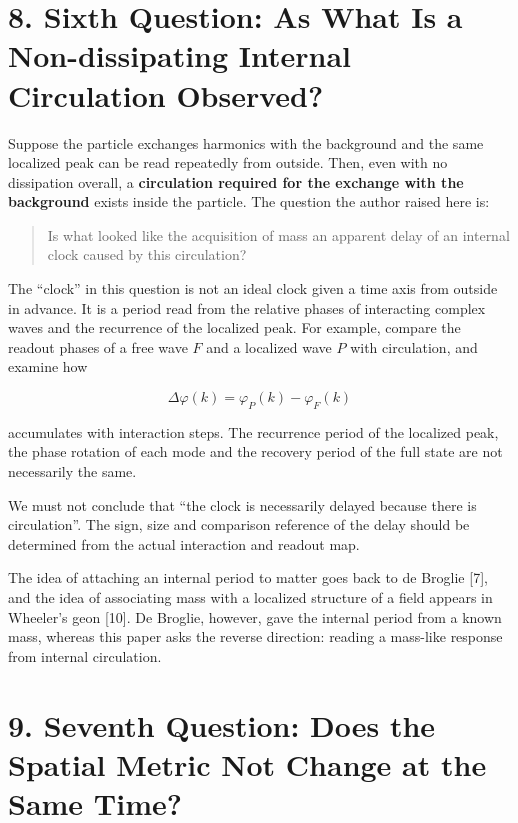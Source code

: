 \documentclass[
  a4paper,
]{article}
\begin{document}
\section{8. Sixth Question: As What Is a Non-dissipating Internal
Circulation
Observed?}\label{sixth-question-as-what-is-a-non-dissipating-internal-circulation-observed}

Suppose the particle exchanges harmonics with the background and the
same localized peak can be read repeatedly from outside. Then, even with
no dissipation overall, a \textbf{circulation required for the exchange
with the background} exists inside the particle. The question the author
raised here is:

\begin{quote}
Is what looked like the acquisition of mass an apparent delay of an
internal clock caused by this circulation?
\end{quote}

The ``clock'' in this question is not an ideal clock given a time axis
from outside in advance. It is a period read from the relative phases of
interacting complex waves and the recurrence of the localized peak. For
example, compare the readout phases of a free wave \(F\) and a localized
wave \(P\) with circulation, and examine how

\[
\Delta\varphi(k)=\varphi_P(k)-\varphi_F(k)
\]

accumulates with interaction steps. The recurrence period of the
localized peak, the phase rotation of each mode and the recovery period
of the full state are not necessarily the same.

We must not conclude that ``the clock is necessarily delayed because
there is circulation''. The sign, size and comparison reference of the
delay should be determined from the actual interaction and readout map.

The idea of attaching an internal period to matter goes back to de
Broglie {[}7{]}, and the idea of associating mass with a localized
structure of a field appears in Wheeler's geon {[}10{]}. De Broglie,
however, gave the internal period from a known mass, whereas this paper
asks the reverse direction: reading a mass-like response from internal
circulation.

\section{9. Seventh Question: Does the Spatial Metric Not Change at the
Same
Time?}\label{seventh-question-does-the-spatial-metric-not-change-at-the-same-time}
\end{document}
